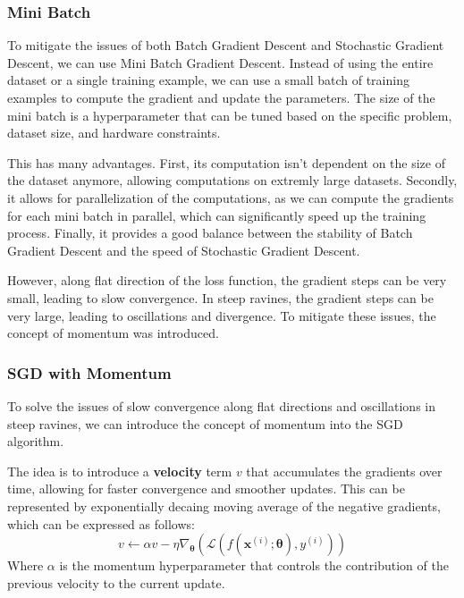 \subsubsection*{Mini Batch}
To mitigate the issues of both Batch Gradient Descent and Stochastic Gradient Descent, we can use Mini Batch Gradient Descent. Instead
of using the entire dataset or a single training example, we can use a small batch of training examples to compute the gradient and update the parameters.
The size of the mini batch is a hyperparameter that can be tuned based on the specific problem, dataset size, and hardware constraints.

This has many advantages. First, its computation isn't dependent on the size of the dataset anymore,
allowing computations on extremly large datasets.
Secondly, it allows for parallelization of the computations, as we can compute the gradients for each mini batch in parallel, which can significantly speed up the training process.
Finally, it provides a good balance between the stability of Batch Gradient Descent and the speed of Stochastic Gradient Descent.

However, along flat direction of the loss function, the gradient steps can be very small, leading to slow convergence.
In steep ravines, the gradient steps can be very large, leading to oscillations and divergence.
To mitigate these issues, the concept of momentum was introduced.

\subsubsection{SGD with Momentum}
To solve the issues of slow convergence along flat directions and oscillations in steep ravines, we can introduce the concept of momentum into the SGD algorithm.

The idea is to introduce a \textbf{velocity} term $v$ that accumulates the gradients over time, allowing for faster convergence and smoother updates.
This can be represented by exponentially decaing moving average of the negative gradients, which can be expressed as follows:
\begin{equation*}
    v \leftarrow \alpha v - \eta \nabla_{\boldsymbol{\theta}} (\mathcal{L}(f(\boldsymbol{x}^{(i)}; \boldsymbol{\theta}), y^{(i)}))
\end{equation*}
Where $\alpha$ is the momentum hyperparameter that controls the contribution of the previous velocity to the current update.

